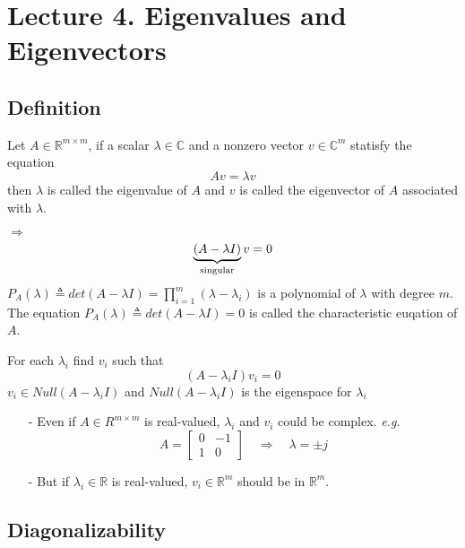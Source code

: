 \section{Lecture 4. Eigenvalues and Eigenvectors}
\begin{multicols}{2}
\subsection{Definition}
\begin{definition}
    Let $A\in\mathbb{R}^{m\times m}$, if a scalar $\lambda\in\mathbb{C}$ and a nonzero vector $v\in\mathbb{C}^m$ statisfy the equation 
    \[
        Av=\lambda v
    \]
    then $\lambda$ is called the eigenvalue of $A$ and $v$ is called the eigenvector of $A$ associated with $\lambda$.
\end{definition}
$\Longrightarrow$ 
\[
    \underbrace{(A-\lambda I)}_{\text{\rm singular}}v = 0
\]
$P_A(\lambda)\triangleq det(A-\lambda I)=\prod_{i=1}^m(\lambda-\lambda_i)$ is a polynomial of $\lambda$ with degree $m$.
The equation $P_A(\lambda)\triangleq det(A-\lambda I)=0$ is called the characteristic euqation of $A$.

For each $\lambda_i$ find $v_i$ such that 
\[
    (A-\lambda_i I)v_i = 0
\]
$v_i\in Null(A-\lambda_i I)$ and $Null(A-\lambda_i I)$ is the eigenspace for $\lambda_i$
\begin{enumerate}
    \item [-] Even if $A\in R^{m\times m}$ is real-valued, $\lambda_i$ and $v_i$ could be complex.
    \emph{e.g.} 
    \[
        A=\begin{bmatrix}
            0& -1 \\ 1 & 0
        \end{bmatrix}\quad \Longrightarrow \quad \lambda = \pm j
    \]
    \item [-] But if $\lambda_i\in\mathbb{R}$ is real-valued, $v_i\in\mathbb{R}^m$ should be in $\mathbb{R}^m$.
\end{enumerate}

\subsection{Diagonalizability}

\end{multicols}
